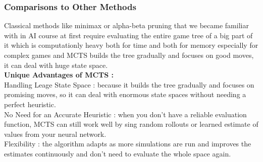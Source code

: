 \subsubsection{Comparisons to Other Methods}
Classical methods like minimax or alpha-beta pruning that we became familiar with in AI course at first require evaluating the entire game tree of a big part of it which is computationly heavy both for time and both for memory especially for complex games and MCTS builds the tree gradually and focuses on good moves, it can deal with huge state space.\\
\textbf{Unique Advantages of MCTS :} \\
Handling Leage State Space : because it builds the tree gradually and focuses on promising moves, so it can deal with enormous state spaces without needing a perfect heuristic.\\
No Need for an Accurate Heuristic : when you don't have a reliable evaluation function, MCTS can still work well by sing random rollouts or learned estimate of values from your neural network.\\
Flexibility : the algorithm adapts as more simulations are run and improves the estimates continuously and don't need to evaluate the whole space again.